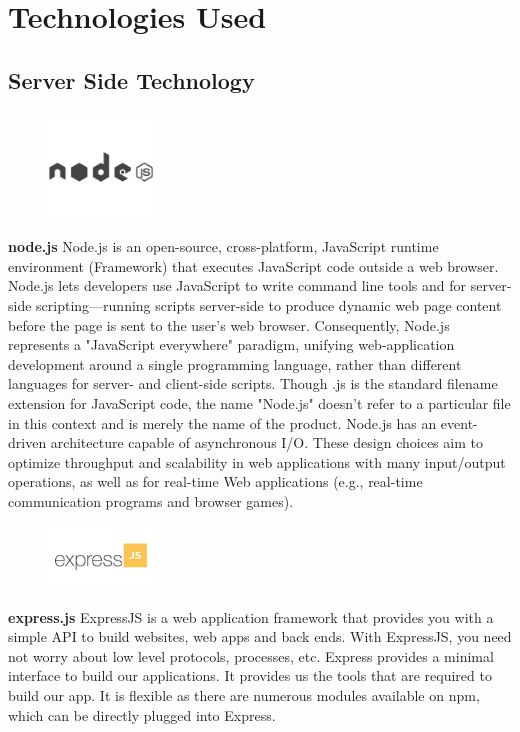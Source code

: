 \section{Technologies Used}
		\vs
		\subsection{Server Side Technology}
		\begin{figure}
			\centering
			\vspace{-60pt}
			\includegraphics[width=0.25\textwidth]{nodejs.png}
			\vspace{-80pt}
		\end{figure}
		\vs
		\textbf{\Large node.js}
		\vs
		Node.js is an open-source, cross-platform, JavaScript runtime environment (Framework) that executes JavaScript code outside a web browser. Node.js lets developers use JavaScript to write command line tools and for server-side scripting—running scripts server-side to produce dynamic web page content before the page is sent to the user's web browser. Consequently, Node.js represents a "JavaScript everywhere" paradigm, unifying web-application development around a single programming language, rather than different languages for server- and client-side scripts.
		\vs
		Though .js is the standard filename extension for JavaScript code, the name "Node.js" doesn't refer to a particular file in this context and is merely the name of the product. Node.js has an event-driven architecture capable of asynchronous I/O. These design choices aim to optimize throughput and scalability in web applications with many input/output operations, as well as for real-time Web applications (e.g., real-time communication programs and browser games).

		\vs[1]
		\begin{figure}
			\centering
			\vspace{-50pt}
			\includegraphics[width=0.25\textwidth]{express.png}
			\vspace{-80pt}
		\end{figure}
		\vs
		\textbf{\Large express.js}
		\vs
	ExpressJS is a web application framework that provides you with a simple API to build websites, web apps and back ends. With ExpressJS, you need not worry about low level protocols, processes, etc.
	\vs
	Express provides a minimal interface to build our applications. It provides us the tools that are required to build our app. It is flexible as there are numerous modules available on npm, which can be directly plugged into Express.
	
